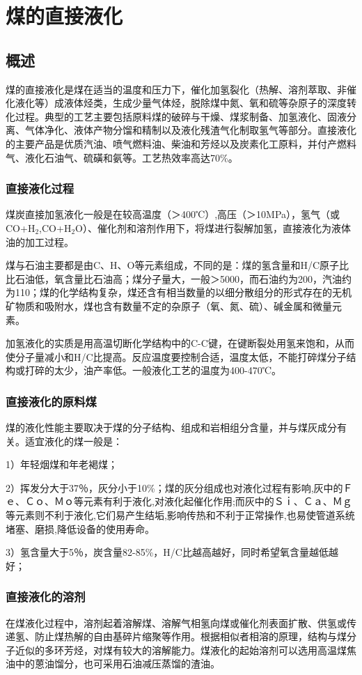 \documentclass[10pt,openany]{ctexbook}
\begin{document}
\section{煤的直接液化}
\subsection{概述}
煤的直接液化是煤在适当的温度和压力下，催化加氢裂化（热解、溶剂萃取、非催化液化等）成液体烃类，生成少量气体烃，脱除煤中氮、氧和硫等杂原子的深度转化过程。典型的工艺主要包括原料煤的破碎与干燥、煤浆制备、加氢液化、固液分离、气体净化、液体产物分馏和精制以及液化残渣气化制取氢气等部分。直接液化的主要产品是优质汽油、喷气燃料油、柴油和芳烃以及炭素化工原料，并付产燃料气、液化石油气、硫磺和氨等。工艺热效率高达70\%。
\subsubsection{直接液化过程}
    煤炭直接加氢液化一般是在较高温度（＞400℃）,高压（＞10MPa），氢气（或CO+H$_2$,CO+H$_2$O）、催化剂和溶剂作用下，将煤进行裂解加氢，直接液化为液体油的加工过程。\par
    煤与石油主要都是由C、H、O等元素组成，不同的是：煤的氢含量和H/C原子比比石油低，氧含量比石油高；煤分子量大，一般＞5000，而石油约为200，汽油约为110；煤的化学结构复杂，煤还含有相当数量的以细分散组分的形式存在的无机矿物质和吸附水，煤也含有数量不定的杂原子（氧、氮、硫）、碱金属和微量元素。\par
加氢液化的实质是用高温切断化学结构中的C-C键，在键断裂处用氢来饱和，从而使分子量减小和H/C比提高。反应温度要控制合适，温度太低，不能打碎煤分子结构或打碎的太少，油产率低。一般液化工艺的温度为400-470℃。
\subsubsection{直接液化的原料煤}
煤的液化性能主要取决于煤的分子结构、组成和岩相组分含量，并与煤灰成分有关。适宜液化的煤一般是：\par
1）年轻烟煤和年老褐煤；\par
2）挥发分大于37％，灰分小于10\%；煤的灰分组成也对液化过程有影响,灰中的Ｆｅ、Ｃｏ、Ｍｏ等元素有利于液化,对液化起催化作用;而灰中的Ｓｉ、Ｃａ、Ｍｇ等元素则不利于液化,它们易产生结垢,影响传热和不利于正常操作,也易使管道系统堵塞、磨损,降低设备的使用寿命。\par
3）氢含量大于5％，炭含量82-85\%，H/C比越高越好，同时希望氧含量越低越好；
\subsubsection{直接液化的溶剂}
在煤液化过程中，溶剂起着溶解煤、溶解气相氢向煤或催化剂表面扩散、供氢或传递氢、防止煤热解的自由基碎片缩聚等作用。根据相似者相溶的原理，结构与煤分子近似的多环芳烃，对煤有较大的溶解能力。煤液化的起始溶剂可以选用高温煤焦油中的蒽油馏分，也可采用石油减压蒸馏的渣油。
\end{document}
